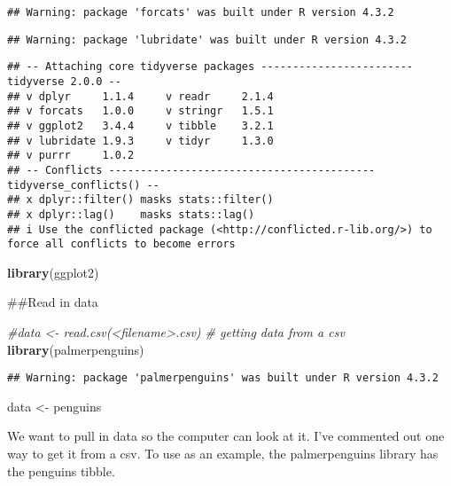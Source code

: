 \documentclass[
]{article}
\newenvironment{Shaded}{\begin{snugshade}}{\end{snugshade}}
\newcommand{\CommentTok}[1]{\textcolor[rgb]{0.56,0.35,0.01}{\textit{#1}}}
\newcommand{\FunctionTok}[1]{\textcolor[rgb]{0.13,0.29,0.53}{\textbf{#1}}}
\newcommand{\NormalTok}[1]{#1}
\newcommand{\OtherTok}[1]{\textcolor[rgb]{0.56,0.35,0.01}{#1}}
\begin{document}
\begin{verbatim}
## Warning: package 'forcats' was built under R version 4.3.2
\end{verbatim}

\begin{verbatim}
## Warning: package 'lubridate' was built under R version 4.3.2
\end{verbatim}

\begin{verbatim}
## -- Attaching core tidyverse packages ------------------------ tidyverse 2.0.0 --
## v dplyr     1.1.4     v readr     2.1.4
## v forcats   1.0.0     v stringr   1.5.1
## v ggplot2   3.4.4     v tibble    3.2.1
## v lubridate 1.9.3     v tidyr     1.3.0
## v purrr     1.0.2     
## -- Conflicts ------------------------------------------ tidyverse_conflicts() --
## x dplyr::filter() masks stats::filter()
## x dplyr::lag()    masks stats::lag()
## i Use the conflicted package (<http://conflicted.r-lib.org/>) to force all conflicts to become errors
\end{verbatim}

\begin{Shaded}
\begin{Highlighting}[]
\FunctionTok{library}\NormalTok{(ggplot2)}
\end{Highlighting}
\end{Shaded}

\#\#Read in data

\begin{Shaded}
\begin{Highlighting}[]
\CommentTok{\#data \textless{}{-} read.csv(\textless{}filename\textgreater{}.csv) \# getting data from a csv}
\FunctionTok{library}\NormalTok{(palmerpenguins)}
\end{Highlighting}
\end{Shaded}

\begin{verbatim}
## Warning: package 'palmerpenguins' was built under R version 4.3.2
\end{verbatim}

\begin{Shaded}
\begin{Highlighting}[]
\NormalTok{data }\OtherTok{\textless{}{-}}\NormalTok{ penguins}
\end{Highlighting}
\end{Shaded}

We want to pull in data so the computer can look at it. I've commented
out one way to get it from a csv. To use as an example, the
palmerpenguins library has the penguins tibble.
\end{document}
